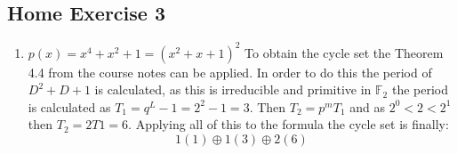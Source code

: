 \documentclass{article}
\begin{document}
\subsection{Home Exercise 3}

\begin{enumerate}
    \item $p(x)=x^4+x^2+1=(x^2+x+1)^2$ \newline
    To obtain the cycle set the Theorem 4.4 from the course notes can be applied. In order to do this the period of $D^2+D+1$ is calculated, as this is irreducible and primitive in $\mathbb F_{2}$ the period is calculated as $T_1 = q^L - 1 = 2^2-1 = 3$. Then $T_2 = p^mT_1$ and as $2^0<2<2^1$ then $T_2 = 2T1 = 6$. Applying all of this to the formula the cycle set is finally:
    $$1(1) \oplus 1(3) \oplus 2(6) $$


\end{enumerate}
\end{document}
